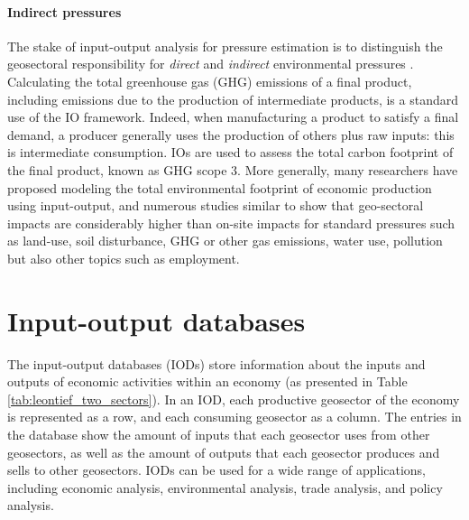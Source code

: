\documentclass{article}
\begin{document}
\paragraph{Indirect pressures} The stake of input-output analysis for pressure estimation is to distinguish the geosectoral responsibility for \textit{direct} and \textit{indirect} environmental pressures \cite{eder1999environmental}. Calculating the total greenhouse gas (GHG) emissions of a final product, including emissions due to the production of intermediate products, is a standard use of the IO framework. Indeed, when manufacturing a product to satisfy a final demand, a producer generally uses the production of others plus raw inputs: this is intermediate consumption. IOs are used to assess the total carbon footprint of the final product, known as GHG scope 3. More generally, many researchers have proposed modeling the total environmental footprint of economic production using input-output, and numerous studies similar to \cite{lenzen2003environmental,wiedmann2007examining,wiedmann2015material} show that geo-sectoral impacts are considerably higher than on-site impacts for standard pressures such as land-use, soil disturbance, GHG or other gas emissions, water use, pollution but also other topics such as employment. 

\section{Input-output databases}
\label{appendix:io_databases}

The input-output databases (IODs) store information about the inputs and outputs of economic activities within an economy (as presented in Table \ref{tab:leontief_two_sectors}). In an IOD, each productive geosector of the economy is represented as a row, and each consuming geosector as a column. The entries in the database show the amount of inputs that each geosector uses from other geosectors, as well as the amount of outputs that each geosector produces and sells to other geosectors. 
IODs can be used for a wide range of applications, including economic analysis, environmental analysis, trade analysis, and policy analysis. 

\vspace{0.1cm}
\end{document}
